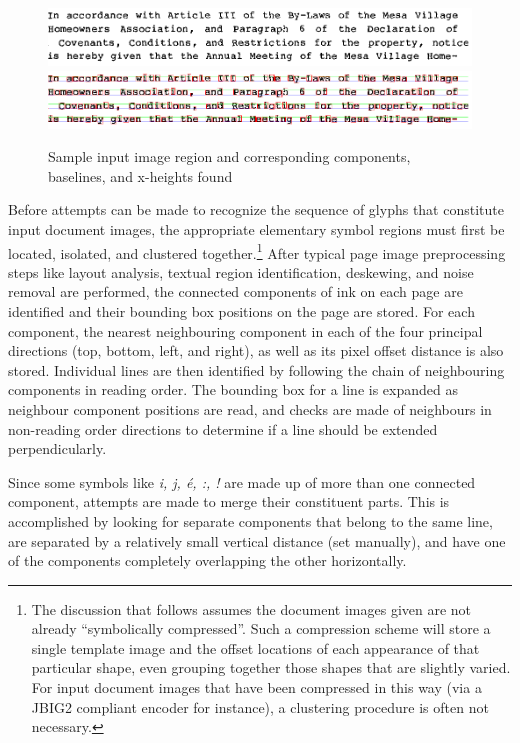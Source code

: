 \documentclass[times, 10pt,twocolumn]{article}
\begin{document}
\begin{figure}[ht]
  \centering
  \includegraphics[scale=1]{figures/input_lines}
  \includegraphics[scale=1]{figures/line_comps}
  \caption{Sample input image region and corresponding components, baselines,
           and x-heights found}
  \label{inimg_fig}
\end{figure}


Before attempts can be made to recognize the sequence of glyphs that 
constitute input document images, the appropriate elementary symbol regions 
must first be located, isolated, and clustered together.\footnote{The
discussion that follows assumes the document images given are not
already ``symbolically compressed''. Such a compression scheme will
store a single template image and the offset locations of each
appearance of that particular shape, even grouping together
those shapes that are slightly varied.  For input document images that
have been compressed in this way (via a JBIG2 compliant encoder 
for instance), a clustering procedure is often not necessary.}
After typical page image preprocessing steps like layout analysis, textual
region identification, deskewing, and noise removal are performed, the
connected components of ink on each page are identified and their bounding box
positions on the page are stored.  For each component, the nearest neighbouring
component in each of the four principal directions (top, bottom, left, and
right), as well as its pixel offset distance is also stored.  Individual lines
are then identified by following the chain of neighbouring components in
reading order.  The bounding box for a line is expanded as neighbour
component positions are read, and checks are made of neighbours in non-reading
order directions to determine if a line should be extended perpendicularly.

Since some symbols like {\em i, j, \'{e}, :, !} are made up of more than one
connected component, attempts are made to merge their constituent parts.  This
is accomplished by looking for separate components that belong to the same
line, are separated by a relatively small vertical distance (set manually), and
have one of the components completely overlapping the other horizontally.
\end{document}
